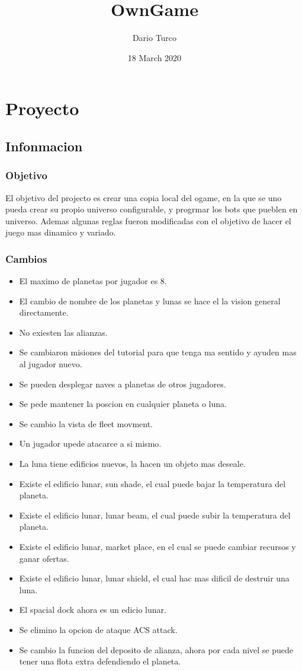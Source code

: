 \documentclass{article}
\title{OwnGame}
\author{Dario Turco}
\date{18 March 2020}
\begin{document}
\section{Proyecto}
    \subsection{Infonmacion}
        \subsubsection{Objetivo}
        El objetivo del projecto es crear una copia local del ogame, en la que se uno pueda crear su propio universo configurable, y progrmar los bots que pueblen en universo. Ademas algunas reglas fueron modificadas con el objetivo de hacer el juego mas dinamico y variado.
        \subsubsection{Cambios}
        \begin{itemize}
            \item El maximo de planetas por jugador es 8.
            \item El cambio de nombre de los planetas y lunas se hace el la vision general directamente.
            \item No exiesten las alianzas.
            \item Se cambiaron misiones del tutorial para que tenga ma sentido y ayuden mas al jugador nuevo.
            \item Se pueden desplegar naves a planetas de otros jugadores.
            \item Se pede mantener la poscion en cualquier planeta o luna.
            \item Se cambio la vista de fleet movment.
            \item Un jugador upede atacarce a si mismo.
            \item La luna tiene edificios nuevos, la hacen un objeto mas deseale.
            \item Existe el edificio lunar, sun shade, el cual puede bajar la temperatura del planeta.
            \item Existe el edificio lunar, lunar beam, el cual puede subir la temperatura del planeta.
            \item Existe el edificio lunar, market place, en el cual se puede cambiar recursos y ganar ofertas.
            \item Existe el edificio lunar, lunar shield, el cual hac mas dificil de destruir una luna.
            \item El spacial dock ahora es un edicio lunar.
            \item Se elimino la opcion de ataque ACS attack.
            \item Se cambio la funcion del deposito de alianza, ahora por cada nivel se puede tener una flota extra defendiendo el planeta.
        \end{itemize}
\end{document}

